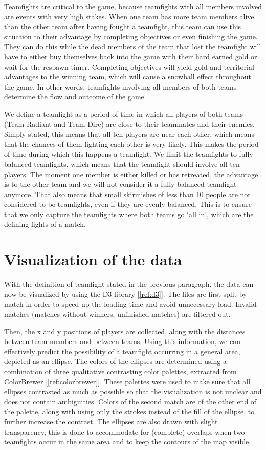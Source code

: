\documentclass[11pt,twoside,a4paper]{article}
\begin{document}
Teamfights are critical to the game, because teamfights with all members involved are events with very high stakes. When one team has more team members alive than the other team after having fought a teamfight, this team can use this situation to their advantage by completing objectives or even finishing the game. They can do this while the dead members of the team that lost the teamfight will have to either buy themselves back into the game with their hard earned gold or wait for the respawn timer. Completing objectives will yield gold and territorial advantages to the winning team, which will cause a snowball effect throughout the game. In other words, teamfights involving all members of both teams determine the flow and outcome of the game.

We define a teamfight as a period of time in which all players of both teams (Team Radiant and Team Dire) are close to their teammates and their enemies. Simply stated, this means that all ten players are near each other, which means that the chances of them fighting each other is very likely. This makes the period of time during which this happens a teamfight. We limit the teamfights to fully balanced teamfights, which means that the teamfight should involve all ten players. The moment one member is either killed or has retreated, the advantage is to the other team and we will not consider it a fully balanced teamfight anymore. That also means that small skirmishes of less than 10 people are not considered to be teamfights, even if they are evenly balanced. This is to ensure that we only capture the teamfights where both teams go `all in', which are the defining fights of a match.

\section*{Visualization of the data}
With the definition of teamfight stated in the previous paragraph, the data can now be visualized by using the D3 library [\ref{ref:d3}]. The files are first split by match in order to speed up the loading time and avoid unnecessary load. Invalid matches (matches without winners, unfinished matches) are filtered out. 

Then, the x and y positions of players are collected, along with the distances between team members and between teams. Using this information, we can effectively predict the possibility of a teamfight occurring in a general area, depicted as an ellipse. The colors of the ellipses are determined using a combination of three qualitative contrasting color palettes, extracted from ColorBrewer [\ref{ref:colorbrewer}]. These palettes were used to make sure that all ellipses contrasted as much as possible so that the visualization is not unclear and does not contain ambiguities. Colors of the second match are of the other end of the palette, along with using only the strokes instead of the fill of the ellipse, to further increase the contrast.
The ellipses are also drawn with slight transparency, this is done to accommodate for (complete) overlaps when two teamfights occur in the same area and to keep the contours of the map visible.
\end{document}
